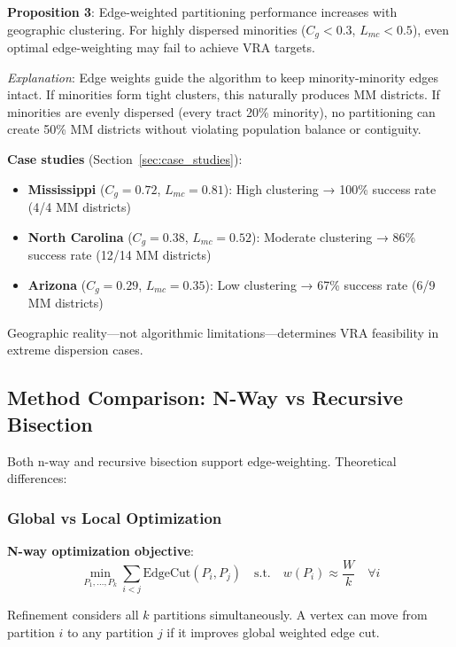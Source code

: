 \textbf{Proposition 3}: Edge-weighted partitioning performance increases with geographic clustering. For highly dispersed minorities ($C_g < 0.3$, $L_{mc} < 0.5$), even optimal edge-weighting may fail to achieve VRA targets.

\textit{Explanation}: Edge weights guide the algorithm to keep minority-minority edges intact. If minorities form tight clusters, this naturally produces MM districts. If minorities are evenly dispersed (every tract 20\% minority), no partitioning can create 50\% MM districts without violating population balance or contiguity.

\textbf{Case studies} (Section~\ref{sec:case_studies}):
\begin{itemize}
\item \textbf{Mississippi} ($C_g = 0.72$, $L_{mc} = 0.81$): High clustering → 100\% success rate (4/4 MM districts)
\item \textbf{North Carolina} ($C_g = 0.38$, $L_{mc} = 0.52$): Moderate clustering → 86\% success rate (12/14 MM districts)
\item \textbf{Arizona} ($C_g = 0.29$, $L_{mc} = 0.35$): Low clustering → 67\% success rate (6/9 MM districts)
\end{itemize}

Geographic reality—not algorithmic limitations—determines VRA feasibility in extreme dispersion cases.

\subsection{Method Comparison: N-Way vs Recursive Bisection}

Both n-way and recursive bisection support edge-weighting. Theoretical differences:

\subsubsection{Global vs Local Optimization}

\textbf{N-way optimization objective}:
\begin{equation}
\min_{P_1, \ldots, P_k} \sum_{i < j} \text{EdgeCut}(P_i, P_j) \quad \text{s.t.} \quad w(P_i) \approx \frac{W}{k} \quad \forall i
\end{equation}

Refinement considers all $k$ partitions simultaneously. A vertex can move from partition $i$ to any partition $j$ if it improves global weighted edge cut.

